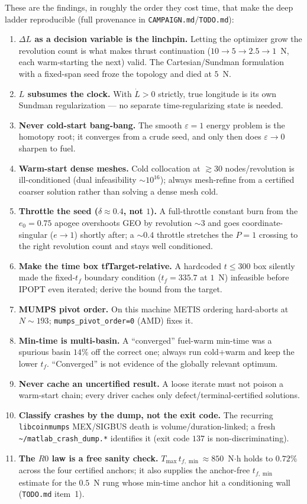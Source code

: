 \documentclass[11pt]{article}
\newcommand{\code}[1]{\texttt{\small #1}}
\newcommand{\file}[1]{\texttt{\small #1}}
\newcommand{\Tmax}{T_{\max}}
\begin{document}
These are the findings, in roughly the order they cost time, that make the deep
ladder reproducible (full provenance in \file{CAMPAIGN.md}/\file{TODO.md}):
\begin{enumerate}[leftmargin=1.4em]
\item \textbf{$\Delta L$ as a decision variable is the linchpin.} Letting the
optimizer grow the revolution count is what makes thrust continuation
($10\to5\to2.5\to1$~N, each warm-starting the next) valid. The Cartesian/Sundman
formulation with a fixed-span seed froze the topology and died at $5$~N.
\item \textbf{$L$ subsumes the clock.} With $\dot L>0$ strictly, true longitude is
its own Sundman regularization --- no separate time-regularizing state is needed.
\item \textbf{Never cold-start bang-bang.} The smooth $\varepsilon=1$ energy
problem is the homotopy root; it converges from a crude seed, and only then does
$\varepsilon\to0$ sharpen to fuel.
\item \textbf{Warm-start dense meshes.} Cold collocation at $\gtrsim30$
nodes/revolution is ill-conditioned (dual infeasibility $\sim10^{16}$); always
mesh-refine from a certified coarser solution rather than solving a dense mesh cold.
\item \textbf{Throttle the seed ($\delta\approx0.4$, not $1$).} A full-throttle
constant burn from the $e_0=0.75$ apogee overshoots GEO by revolution $\sim3$ and
goes coordinate-singular ($e\to1$) shortly after; a $\sim0.4$ throttle stretches
the $P=1$ crossing to the right revolution count and stays well conditioned.
\item \textbf{Make the time box tfTarget-relative.} A hardcoded $t\le300$ box
silently made the fixed-$t_f$ boundary condition ($t_f=335.7$ at $1$~N)
infeasible before IPOPT even iterated; derive the bound from the target.
\item \textbf{MUMPS pivot order.} On this machine METIS ordering hard-aborts at
$N\!\sim\!193$; \code{mumps\_pivot\_order=0} (AMD) fixes it.
\item \textbf{Min-time is multi-basin.} A ``converged'' fuel-warm min-time was a
spurious basin $14\%$ off the correct one; always run cold+warm and keep the lower
$t_f$. ``Converged'' is not evidence of the globally relevant optimum.
\item \textbf{Never cache an uncertified result.} A loose iterate must not poison a
warm-start chain; every driver caches only defect/terminal-certified solutions.
\item \textbf{Classify crashes by the dump, not the exit code.} The recurring
\texttt{libcoinmumps} MEX/SIGBUS death is volume/duration-linked; a fresh
\file{\textasciitilde/matlab\_crash\_dump.*} identifies it (exit code $137$ is
non-discriminating).
\item \textbf{The $R0$ law is a free sanity check.} $\Tmax\,t_{f,\min}\approx
850$~N$\cdot$h holds to $0.72\%$ across the four certified anchors; it also
supplies the anchor-free $t_{f,\min}$ estimate for the $0.5$~N rung whose
min-time anchor hit a conditioning wall (\file{TODO.md} item~1).
\end{enumerate}
\end{document}
